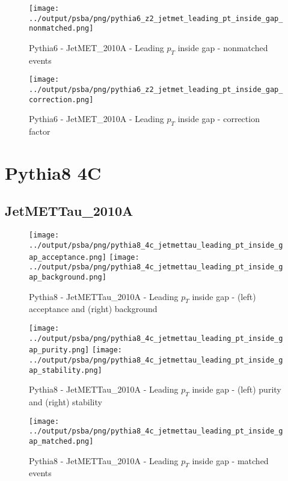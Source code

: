 \documentclass[11pt]{book}
\begin{document}
\begin{figure}[ht]
\centering
\texttt{[image: ../output/psba/png/pythia6\_z2\_jetmet\_leading\_pt\_inside\_gap\_nonmatched.png]}
\caption{Pythia6 - JetMET\_2010A - Leading $p_{T}$ inside gap - nonmatched events}
\label{fig:p6_jetmet_leading_pt_inside_gap_nonmatched}
\end{figure}

\begin{figure}[ht]
\centering
\texttt{[image: ../output/psba/png/pythia6\_z2\_jetmet\_leading\_pt\_inside\_gap\_correction.png]}
\caption{Pythia6 - JetMET\_2010A - Leading $p_{T}$ inside gap - correction factor}
\label{fig:p6_jetmet_leading_pt_inside_gap_correction}
\end{figure}


\clearpage

\section{Pythia8 4C}
\subsection{JetMETTau\_2010A}

\begin{figure}[ht]
\centering
\texttt{[image: ../output/psba/png/pythia8\_4c\_jetmettau\_leading\_pt\_inside\_gap\_acceptance.png]}
\texttt{[image: ../output/psba/png/pythia8\_4c\_jetmettau\_leading\_pt\_inside\_gap\_background.png]}
\caption{Pythia8 - JetMETTau\_2010A - Leading $p_{T}$ inside gap - (left) acceptance and (right) background}
\label{fig:p8_jetmettau_leading_pt_inside_gap_ab}
\end{figure}

\begin{figure}[ht]
\centering
\texttt{[image: ../output/psba/png/pythia8\_4c\_jetmettau\_leading\_pt\_inside\_gap\_purity.png]}
\texttt{[image: ../output/psba/png/pythia8\_4c\_jetmettau\_leading\_pt\_inside\_gap\_stability.png]}
\caption{Pythia8 - JetMETTau\_2010A - Leading $p_{T}$ inside gap - (left) purity and (right) stability}
\label{fig:p8_jetmettau_leading_pt_inside_gap_ps}
\end{figure}

\begin{figure}[ht]
\centering
\texttt{[image: ../output/psba/png/pythia8\_4c\_jetmettau\_leading\_pt\_inside\_gap\_matched.png]}
\caption{Pythia8 - JetMETTau\_2010A - Leading $p_{T}$ inside gap - matched events}
\label{fig:p8_jetmettau_leading_pt_inside_gap_matched}
\end{figure}
\end{document}
